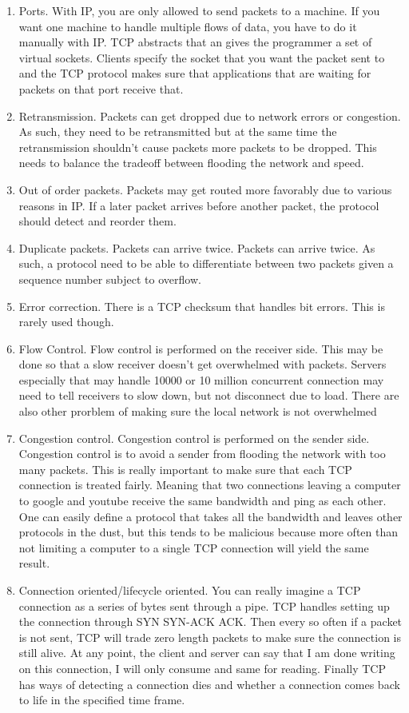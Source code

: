 \documentclass[]{article}
\begin{document}
\begin{enumerate}
\item
  Ports. With IP, you are only allowed to send packets to a machine. If
  you want one machine to handle multiple flows of data, you have to do
  it manually with IP. TCP abstracts that an gives the programmer a set
  of virtual sockets. Clients specify the socket that you want the
  packet sent to and the TCP protocol makes sure that applications that
  are waiting for packets on that port receive that.
\item
  Retransmission. Packets can get dropped due to network errors or
  congestion. As such, they need to be retransmitted but at the same
  time the retransmission shouldn't cause packets more packets to be
  dropped. This needs to balance the tradeoff between flooding the
  network and speed.
\item
  Out of order packets. Packets may get routed more favorably due to
  various reasons in IP. If a later packet arrives before another
  packet, the protocol should detect and reorder them.
\item
  Duplicate packets. Packets can arrive twice. Packets can arrive twice.
  As such, a protocol need to be able to differentiate between two
  packets given a sequence number subject to overflow.
\item
  Error correction. There is a TCP checksum that handles bit errors.
  This is rarely used though.
\item
  Flow Control. Flow control is performed on the receiver side. This may
  be done so that a slow receiver doesn't get overwhelmed with packets.
  Servers especially that may handle 10000 or 10 million concurrent
  connection may need to tell receivers to slow down, but not disconnect
  due to load. There are also other prorblem of making sure the local
  network is not overwhelmed
\item
  Congestion control. Congestion control is performed on the sender
  side. Congestion control is to avoid a sender from flooding the
  network with too many packets. This is really important to make sure
  that each TCP connection is treated fairly. Meaning that two
  connections leaving a computer to google and youtube receive the same
  bandwidth and ping as each other. One can easily define a protocol
  that takes all the bandwidth and leaves other protocols in the dust,
  but this tends to be malicious because more often than not limiting a
  computer to a single TCP connection will yield the same result.
\item
  Connection oriented/lifecycle oriented. You can really imagine a TCP
  connection as a series of bytes sent through a pipe. TCP handles
  setting up the connection through SYN SYN-ACK ACK. Then every so often
  if a packet is not sent, TCP will trade zero length packets to make
  sure the connection is still alive. At any point, the client and
  server can say that I am done writing on this connection, I will only
  consume and same for reading. Finally TCP has ways of detecting a
  connection dies and whether a connection comes back to life in the
  specified time frame.
\end{enumerate}
\end{document}
